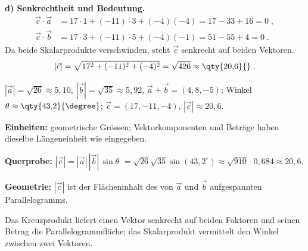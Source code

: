 \textbf{d) Senkrechtheit und Bedeutung.}
\begin{align}
  \vec c\cdot\vec a &= 17\cdot1+(-11)\cdot3+(-4)(-4)=17-33+16=0\;,\\
  \vec c\cdot\vec b &= 17\cdot3+(-11)\cdot5+(-4)(-1)=51-55+4=0\;.
\end{align}
Da beide Skalarprodukte verschwinden, steht $\vec c$ senkrecht auf beiden
Vektoren.
\begin{equation}
  |\vec c|=\sqrt{17^2+(-11)^2+(-4)^2}=\sqrt{426}\approx\qty{20{,}6}{}\;.
\end{equation}

\begin{ergebnis}
$|\vec a|=\sqrt{26}\approx5{,}10$, $|\vec b|=\sqrt{35}\approx5{,}92$,
$\vec a+\vec b=(4,8,-5)$; Winkel $\theta\approx\qty{43{,}2}{\degree}$;
$\vec c=(17,-11,-4)$, $|\vec c|\approx20{,}6$.
\end{ergebnis}

\begin{kontrolle}
\textbf{Einheiten:} geometrische Grössen; Vektorkomponenten und Beträge
haben dieselbe Längeneinheit wie eingegeben. \checkmark

\textbf{Querprobe:} $|\vec c|=|\vec a|\,|\vec b|\,\sin\theta$
$=\sqrt{26}\sqrt{35}\sin(43{,}2^\circ)\approx\sqrt{910}\cdot0{,}684\approx20{,}6$. \checkmark

\textbf{Geometrie:} $|\vec c|$ ist der Flächeninhalt des von $\vec a$ und
$\vec b$ aufgespannten Parallelogramms.
\end{kontrolle}

\begin{merksatz}
Das Kreuzprodukt liefert einen Vektor senkrecht auf beiden Faktoren und
seinen Betrag die Parallelogrammfläche; das Skalarprodukt vermittelt den
Winkel zwischen zwei Vektoren.
\end{merksatz}
